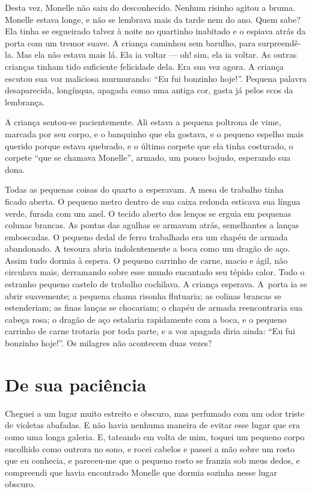 Desta vez, Monelle não saiu do desconhecido. Nenhum risinho agitou a
bruma. Monelle estava longe, e não se lembrava mais da tarde nem do ano.
Quem sabe? Ela tinha se esgueirado talvez à noite no quartinho inabitado e
o espiava atrás da porta com um tremor suave. A criança caminhou sem
barulho, para surpreendê-la. Mas ela não estava mais lá. Ela ia voltar ---
oh! sim, ela ia voltar. As outras crianças tinham tido suficiente
felicidade dela. Era sua vez agora. A criança escutou sua voz maliciosa
murmurando: “Eu fui bonzinho hoje!”. Pequena palavra desaparecida,
longínqua, apagada como uma antiga cor, gasta já pelos ecos da lembrança.

A criança sentou-se pacientemente. Ali estava a pequena poltrona de
vime, marcada por seu corpo, e o banquinho que ela gostava, e o pequeno
espelho mais querido porque estava quebrado, e o último corpete que ela
tinha costurado, o corpete “que se chamava Monelle”, armado, um pouco
bojudo, esperando sua dona.

Todas as pequenas coisas do quarto a esperavam. A mesa de trabalho
tinha ficado aberta. O pequeno metro dentro de sua caixa redonda esticava
sua língua verde, furada com um anel. O tecido aberto dos lenços se erguia
em pequenas colunas brancas. As pontas das agulhas se armavam atrás,
semelhantes a lanças emboscadas. O pequeno dedal de ferro trabalhado era
um chapéu de armada abandonado. A tesoura abria indolentemente a boca como
um dragão de aço. Assim tudo dormia à espera. O pequeno carrinho de carne,
macio e ágil, não circulava mais, derramando sobre esse mundo encantado
seu tépido calor. Todo o estranho pequeno castelo de trabalho cochilava. A
criança esperava. \mbox{A porta} ia se abrir suavemente; a pequena chama risonha
flutuaria; as colinas brancas se estenderiam; as finas lanças se
chocariam; o chapéu de armada reencontraria sua cabeça rosa; o dragão de
aço estalaria rapidamente com a boca, e o pequeno carrinho de carne
trotaria por toda parte, e a voz apagada diria ainda: “Eu fui bonzinho
hoje!”. Os milagres não acontecem duas vezes?

\section{De sua paciência}

Cheguei a um lugar muito estreito e obscuro, mas perfumado com um odor
triste de violetas abafadas. E não havia nenhuma maneira de evitar esse
lugar que era como uma longa galeria. E, tateando em volta de mim, toquei
um pequeno corpo encolhido como outrora no sono, e rocei cabelos e passei
a mão sobre um rosto que eu conhecia, e pareceu-me que o pequeno rosto se
franzia sob meus dedos, e compreendi que havia encontrado Monelle que
dormia sozinha nesse lugar obscuro.

